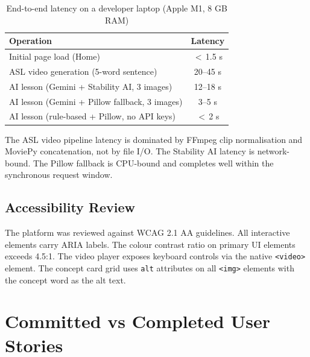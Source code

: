 \documentclass[12pt,a4paper,oneside]{report}
\begin{document}
\begin{table}[h]
\caption{End-to-end latency on a developer laptop (Apple M1, 8 GB RAM)}
\label{tab:latency}
\centering
\small
\begin{tabular}{lc}
\toprule
\textbf{Operation} & \textbf{Latency} \\
\midrule
Initial page load (Home) & $<$\,1.5 s \\
ASL video generation (5-word sentence) & 20--45 s \\
AI lesson (Gemini + Stability AI, 3 images) & 12--18 s \\
AI lesson (Gemini + Pillow fallback, 3 images) & 3--5 s \\
AI lesson (rule-based + Pillow, no API keys) & $<$\,2 s \\
\bottomrule
\end{tabular}
\end{table}

The ASL video pipeline latency is dominated by FFmpeg clip normalisation and MoviePy concatenation, not by file I/O. The Stability AI latency is network-bound. The Pillow fallback is CPU-bound and completes well within the synchronous request window.

\subsection{Accessibility Review}

The platform was reviewed against WCAG 2.1 AA guidelines. All interactive elements carry ARIA labels. The colour contrast ratio on primary UI elements exceeds 4.5:1. The video player exposes keyboard controls via the native \texttt{<video>} element. The concept card grid uses \texttt{alt} attributes on all \texttt{<img>} elements with the concept word as the alt text.

\section{Committed vs Completed User Stories}
\end{document}
